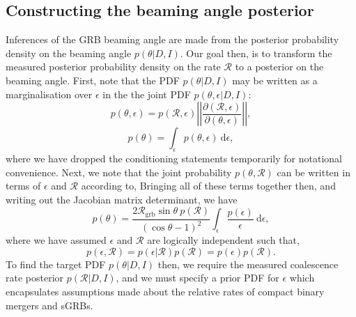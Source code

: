 \documentclass[twocolumn,nofootinbib]{revtex4-1}
\newcommand{\grbrate}{{{\mathcal R}_{\mathrm{grb}}}}
\newcommand{\cbcrate}{{{\mathcal R}}}
\newcommand{\diff}{{\mathrm d}}
\begin{document}
\subsection{Constructing the beaming angle posterior}
Inferences of the GRB beaming angle are made from the posterior probability
density on the beaming angle $p(\theta|D,I)$.  Our goal then, is to transform
the measured posterior probability density on the rate $\cbcrate$ to a posterior
on the beaming angle.
%
First, note that the PDF $p(\theta|D,I)$ may be written as a marginalisation
over $\epsilon$ in the the joint PDF $p(\theta, \epsilon|D,I)$:
%
\begin{equation}
p(\theta,\epsilon) = p(\cbcrate,\epsilon)
\left\lvert\left\lvert
\frac{\partial(\cbcrate,\epsilon)}{\partial(\theta,\epsilon)}
\right\rvert\right\rvert,
\end{equation}
%
\begin{equation}
p(\theta) = \int_{\epsilon} p(\theta,\epsilon)~\diff \epsilon,
\end{equation}
%
where we have dropped the conditioning statements temporarily for notational
convenience.  Next, we note that the joint probability $p(\theta,\cbcrate)$ can
be written in terms of $\epsilon$ and $\cbcrate$ according to,
%
%
%
%
Bringing all of these terms together then, and writing out the Jacobian matrix
determinant, we have
%
\begin{equation}\label{eq:marginaltheta}
p(\theta) = \frac{2\grbrate \sin
\theta~p(\cbcrate)}{(\cos\theta-1)^2}\int_{\epsilon} \frac{p(\epsilon)}{\epsilon} ~\diff
\epsilon,
\end{equation}
%
where we have assumed $\epsilon$ and $\cbcrate$ are logically independent such
that,
\begin{equation}
p(\epsilon,\cbcrate) = p(\epsilon|\cbcrate)p(\cbcrate) = p(\epsilon)p(\cbcrate).
\end{equation}
%
%
To find the target PDF $p(\theta|D,I)$ then, we require the measured coalescence
rate posterior $p(\cbcrate|D,I)$, and we must specify a prior PDF for $\epsilon$
which encapsulates assumptions made about the relative rates of compact binary
mergers and sGRBs.
\end{document}

